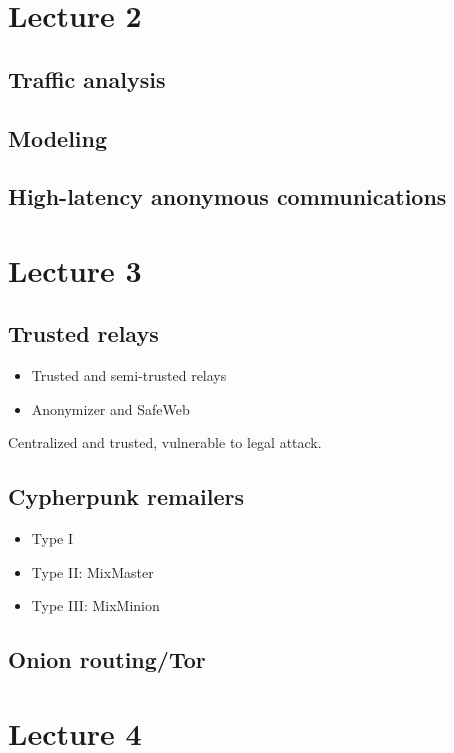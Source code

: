\documentclass[a4paper,12pt,english]{article}
\begin{document}
\setcounter{section}{1}
\section{Lecture 2}
\subsection{Traffic analysis}

\subsection{Modeling}

\subsection{High-latency anonymous communications}

\section{Lecture 3}
\subsection{Trusted relays}
\begin{itemize}
	\item Trusted and semi-trusted relays
	\item Anonymizer and SafeWeb
\end{itemize}
Centralized and trusted, vulnerable to legal attack.

\subsection{Cypherpunk remailers}
\begin{itemize}
	\item Type I
	\item Type II: MixMaster
	\item Type III: MixMinion
\end{itemize}

\subsection{Onion routing/Tor}

\section{Lecture 4}
\end{document}
